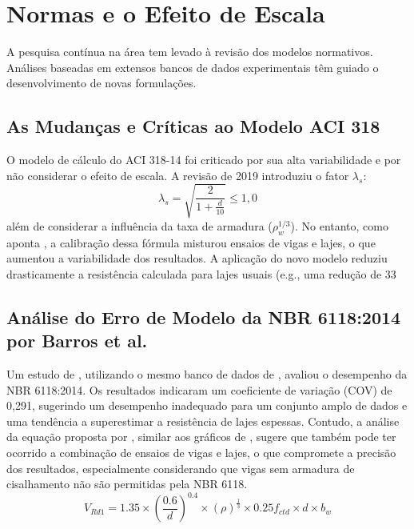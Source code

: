 \documentclass[
	12pt,				%
	openright,			%
	twoside,			%
	a4paper,			%
	chapter=TITLE,		%
	section=TITLE,		%
	subsection=TITLE,	%
	subsubsection=TITLE,%
	partnum=false,
	brazil,			%
]{abntex2}
\begin{document}
\section{Normas e o Efeito de Escala}
A pesquisa contínua na área tem levado à revisão dos modelos normativos. Análises baseadas em extensos bancos de dados experimentais têm guiado o desenvolvimento de novas formulações.

\subsection{As Mudanças e Críticas ao Modelo ACI 318}
O modelo de cálculo do ACI 318-14 foi criticado por sua alta variabilidade e por não considerar o efeito de escala. A revisão de 2019 introduziu o fator $\lambda_s$:
\begin{equation}
    \lambda_s = \sqrt{\frac{2}{1+\frac{d}{10}}}\leq 1,0
\end{equation}
além de considerar a influência da taxa de armadura ($\rho_w^{1/3}$). No entanto, como aponta \textcite{Marquesi2021}, a calibração dessa fórmula misturou ensaios de vigas e lajes, o que aumentou a variabilidade dos resultados. A aplicação do novo modelo reduziu drasticamente a resistência calculada para lajes usuais (e.g., uma redução de 33%

\subsection{Análise do Erro de Modelo da NBR 6118:2014 por Barros et al.}
Um estudo de \textcite{Barros2021}, utilizando o mesmo banco de dados de \textcite{Kuchma2019}, avaliou o desempenho da NBR 6118:2014. Os resultados indicaram um coeficiente de variação (COV) de 0,291, sugerindo um desempenho inadequado para um conjunto amplo de dados e uma tendência a superestimar a resistência de lajes espessas. Contudo, a análise da equação proposta por \textcite{Barros2021}, similar aos gráficos de \textcite{Kuchma2019}, sugere que também pode ter ocorrido a combinação de ensaios de vigas e lajes, o que compromete a precisão dos resultados, especialmente considerando que vigas sem armadura de cisalhamento não são permitidas pela NBR 6118.
\begin{equation}
    V_{Rd1} = 1.35 \times \left(\frac{0.6}{d}\right)^{0.4} \times (\rho)^\frac{1}{3} \times 0.25f_{ctd}\times d \times b_w
    \label{Vrd1mod}
\end{equation}
\end{document}
